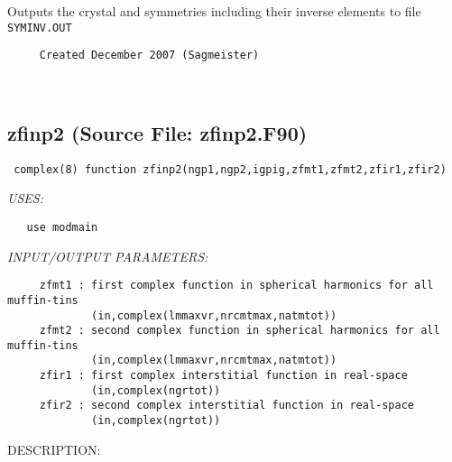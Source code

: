 \documentclass[11pt]{article}
\begin{document}
     Outputs the crystal and symmetries including their inverse
     elements to file {\tt SYMINV.OUT}
  
\begin{verbatim}     Created December 2007 (Sagmeister)\end{verbatim}




















 
 
\mbox{}\hrulefill\ 
 
\subsection{zfinp2 (Source File: zfinp2.F90)}


\begin{verbatim} complex(8) function zfinp2(ngp1,ngp2,igpig,zfmt1,zfmt2,zfir1,zfir2)\end{verbatim}{\em USES:}
\begin{verbatim}   use modmain\end{verbatim}{\em INPUT/OUTPUT PARAMETERS:}
\begin{verbatim}     zfmt1 : first complex function in spherical harmonics for all muffin-tins
             (in,complex(lmmaxvr,nrcmtmax,natmtot))
     zfmt2 : second complex function in spherical harmonics for all muffin-tins
             (in,complex(lmmaxvr,nrcmtmax,natmtot))
     zfir1 : first complex interstitial function in real-space
             (in,complex(ngrtot))
     zfir2 : second complex interstitial function in real-space
             (in,complex(ngrtot))\end{verbatim}
{\sf DESCRIPTION:\\ }
\end{document}
